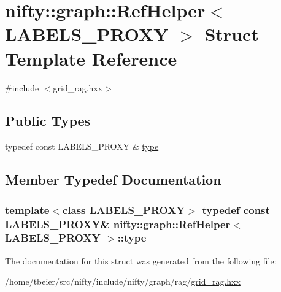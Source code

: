 \hypertarget{structnifty_1_1graph_1_1RefHelper}{}\section{nifty\+:\+:graph\+:\+:Ref\+Helper$<$ L\+A\+B\+E\+L\+S\+\_\+\+P\+R\+O\+X\+Y $>$ Struct Template Reference}
\label{structnifty_1_1graph_1_1RefHelper}


{\ttfamily \#include $<$grid\+\_\+rag.\+hxx$>$}

\subsection*{Public Types}
\begin{DoxyCompactItemize}
\item 
typedef const L\+A\+B\+E\+L\+S\+\_\+\+P\+R\+O\+X\+Y \& \hyperlink{structnifty_1_1graph_1_1RefHelper_a3852a95663c4836064acd3adbab0f807}{type}
\end{DoxyCompactItemize}


\subsection{Member Typedef Documentation}
\hypertarget{structnifty_1_1graph_1_1RefHelper_a3852a95663c4836064acd3adbab0f807}{}
\subsubsection[{type}]{\setlength{\rightskip}{0pt plus 5cm}template$<$class L\+A\+B\+E\+L\+S\+\_\+\+P\+R\+O\+X\+Y$>$ typedef const L\+A\+B\+E\+L\+S\+\_\+\+P\+R\+O\+X\+Y\& {\bf nifty\+::graph\+::\+Ref\+Helper}$<$ L\+A\+B\+E\+L\+S\+\_\+\+P\+R\+O\+X\+Y $>$\+::{\bf type}}\label{structnifty_1_1graph_1_1RefHelper_a3852a95663c4836064acd3adbab0f807}


The documentation for this struct was generated from the following file\+:\begin{DoxyCompactItemize}
\item 
/home/tbeier/src/nifty/include/nifty/graph/rag/\hyperlink{grid__rag_8hxx}{grid\+\_\+rag.\+hxx}\end{DoxyCompactItemize}
